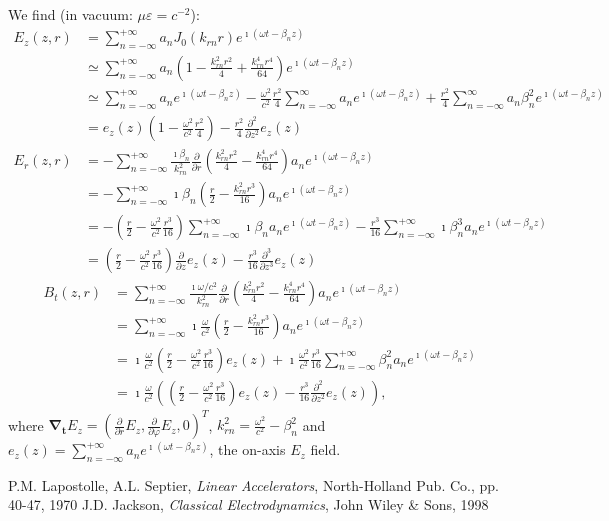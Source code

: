 \documentclass{report}
\begin{document}
We find (in vacuum: $\mu\varepsilon = c^{-2}$):
\begin{align*}
  E_z(z,r) &= \sum_{n=-\infty}^{+\infty} a_n J_0(k_{rn}r) e^{\imath(\omega t - \beta_n z)} \\
           &\simeq \sum_{n=-\infty}^{+\infty} a_n (1 - \frac{k_{rn}^2r^2}{4} + \frac{k_{rn}^4 r^4}{64}) e^{\imath(\omega t - \beta_n z)} \\
           &\simeq \sum_{n=-\infty}^{+\infty} a_n e^{\imath(\omega t - \beta_n z)} - \frac{\omega^2}{c^2}\frac{r^2}{4} \sum_{n=-\infty}^{\infty} a_n e^{\imath(\omega t - \beta_n z)} + \frac{r^2}{4} \sum_{n=-\infty}^{\infty} a_n \beta_n^2 e^{\imath(\omega t - \beta_n z)} \\
           &= e_z(z)(1-\frac{\omega^2}{c^2}\frac{r^2}{4}) - \frac{r^2}{4}\frac{\partial^2}{\partial z^2} e_z(z) \\
  E_r(z,r) &= -\sum_{n=-\infty}^{+\infty} \frac{\imath \beta_n}{k_{rn}^2}\frac{\partial}{\partial r}(\frac{k_{rn}^2 r^2}{4} - \frac{k_{rn}^4 r^4}{64}) a_n e^{\imath(\omega t - \beta_n z)}\\
           &= -\sum_{n=-\infty}^{+\infty} \imath \beta_n(\frac{r}{2} - \frac{k_{rn}^2 r^3}{16}) a_n e^{\imath(\omega t - \beta_n z)}\\
           &= -(\frac{r}{2} - \frac{\omega^2}{c^2}\frac{r^3}{16}) \sum_{n=-\infty}^{+\infty} \imath \beta_n a_n e^{\imath(\omega t - \beta_n z)} -\frac{r^3}{16}\sum_{n=-\infty}^{+\infty} \imath \beta_n^3 a_n e^{\imath(\omega t - \beta_n z)} \\
           &= (\frac{r}{2} - \frac{\omega^2}{c^2}\frac{r^3}{16}) \frac{\partial}{\partial z} e_z(z) - \frac{r^3}{16}\frac{\partial^3}{\partial z^3} e_z(z)
\end{align*}
\begin{align*}
  B_t(z,r) &= \sum_{n=-\infty}^{+\infty} \frac{\imath \omega/c^2}{k_{rn}^2} \frac{\partial}{\partial r}(\frac{k_{rn}^2 r^2}{4} - \frac{k_{rn}^4 r^4}{64}) a_n e^{\imath(\omega t - \beta_n z)}\\
           &= \sum_{n=-\infty}^{+\infty} \imath \frac{\omega}{c^2} (\frac{r}{2} - \frac{k_{rn}^2 r^3}{16}) a_n e^{\imath(\omega t - \beta_n z)}\\
           &= \imath \frac{\omega}{c^2} (\frac{r}{2} - \frac{\omega^2}{c^2}\frac{r^3}{16}) e_z(z) + \imath \frac{\omega^2}{c^2}\frac{r^3}{16} \sum_{n=-\infty}^{+\infty} \beta_n^2 a_n e^{\imath (\omega t - \beta_n z)} \\
           &= \imath \frac{\omega}{c^2}\left((\frac{r}{2}-\frac{\omega^2}{c^2}\frac{r^3}{16})e_z(z) - \frac{r^3}{16}\frac{\partial^2}{\partial z^2} e_z(z)\right),
\end{align*}
where $\mathbf{\nabla_t} E_z = (\frac{\partial}{\partial r} E_z, \frac{\partial}{\partial \varphi} E_z, 0)^{T}$, $k_{rn}^2 = \frac{\omega^2}{c^2} - \beta_n^2$ and $e_z(z) = \sum_{n=-\infty}^{+\infty}a_n e^{\imath(\omega t - \beta_n z)}$, the on-axis $E_z$ field.
\begin{thebibliography}{10}
P.M. Lapostolle, A.L. Septier, {\sl Linear Accelerators}, North-Holland Pub. Co., pp. 40-47, 1970
J.D. Jackson, {\sl Classical Electrodynamics}, John Wiley \& Sons, 1998
\end{thebibliography}
\end{document}
